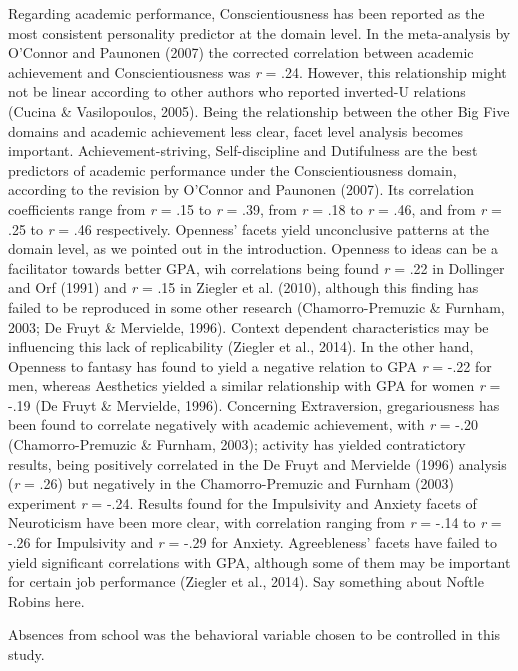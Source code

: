 \documentclass[,man,floatsintext]{apa6}
\theoremstyle{definition}
\theoremstyle{definition}
\theoremstyle{definition}
\theoremstyle{remark}
\begin{document}
Regarding academic performance, Conscientiousness has been reported as
the most consistent personality predictor at the domain level. In the
meta-analysis by O'Connor and Paunonen (2007) the corrected correlation
between academic achievement and Conscientiousness was \emph{r} = .24.
However, this relationship might not be linear according to other
authors who reported inverted-U relations (Cucina \& Vasilopoulos,
2005). Being the relationship between the other Big Five domains and
academic achievement less clear, facet level analysis becomes important.
Achievement-striving, Self-discipline and Dutifulness are the best
predictors of academic performance under the Conscientiousness domain,
according to the revision by O'Connor and Paunonen (2007). Its
correlation coefficients range from \emph{r} = .15 to \emph{r} = .39,
from \emph{r} = .18 to \emph{r} = .46, and from \emph{r} = .25 to
\emph{r} = .46 respectively. Openness' facets yield unconclusive
patterns at the domain level, as we pointed out in the introduction.
Openness to ideas can be a facilitator towards better GPA, wih
correlations being found \emph{r} = .22 in Dollinger and Orf (1991) and
\emph{r} = .15 in Ziegler et al. (2010), although this finding has
failed to be reproduced in some other research (Chamorro-Premuzic \&
Furnham, 2003; De Fruyt \& Mervielde, 1996). Context dependent
characteristics may be influencing this lack of replicability (Ziegler
et al., 2014). In the other hand, Openness to fantasy has found to yield
a negative relation to GPA \emph{r} = -.22 for men, whereas Aesthetics
yielded a similar relationship with GPA for women \emph{r} = -.19 (De
Fruyt \& Mervielde, 1996). Concerning Extraversion, gregariousness has
been found to correlate negatively with academic achievement, with
\emph{r} = -.20 (Chamorro-Premuzic \& Furnham, 2003); activity has
yielded contratictory results, being positively correlated in the De
Fruyt and Mervielde (1996) analysis (\emph{r} = .26) but negatively in
the Chamorro-Premuzic and Furnham (2003) experiment \emph{r} = -.24.
Results found for the Impulsivity and Anxiety facets of Neuroticism have
been more clear, with correlation ranging from \emph{r} = -.14 to
\emph{r} = -.26 for Impulsivity and \emph{r} = -.29 for Anxiety.
Agreebleness' facets have failed to yield significant correlations with
GPA, although some of them may be important for certain job performance
(Ziegler et al., 2014). Say something about Noftle Robins here.

Absences from school was the behavioral variable chosen to be controlled
in this study.
\end{document}
